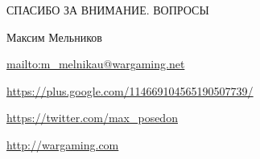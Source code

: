 \documentclass[aspectratio=169]{beamer}
\begin{document}
{


\begin{frame}{СПАСИБО ЗА ВНИМАНИЕ. ВОПРОСЫ}
    \begin{block}{Максим Мельников}
    \par \url{mailto:m\_melnikau@wargaming.net}
    \par \url{https://plus.google.com/114669104565190507739/}
    \par \url{https://twitter.com/max\_posedon}
    \par \url{http://wargaming.com}
    \end{block}
\end{frame}
}
\end{document}
